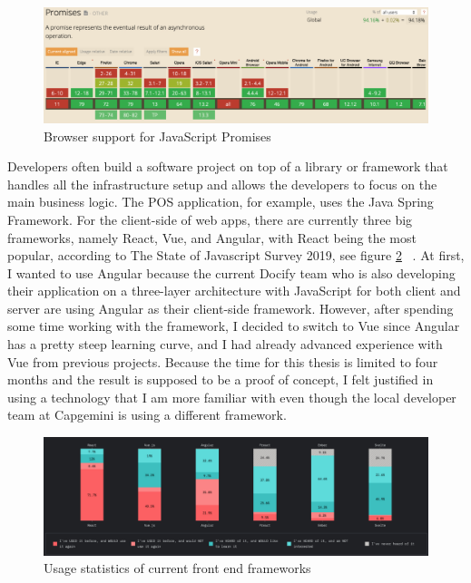 \begin{figure}[ht]
  \centering
  \includegraphics[width=0.8\linewidth]{assets/caniuse-promises.png}
  \caption{Browser support for JavaScript Promises}
  \label{fig:caniuse-promises}
\end{figure}

Developers often build a software project on top of a library or framework that handles all the infrastructure setup and allows the developers to focus on the main business logic. The POS application, for example, uses the Java Spring Framework. For the client-side of web apps, there are currently three big frameworks, namely React, Vue, and Angular, with React being the most popular, according to The State of Javascript Survey 2019, see figure \ref{fig:frontend-framework-usage} ~\cite{stateofjs.2019}. At first, I wanted to use Angular because the current Docify team who is also developing their application on a three-layer architecture with JavaScript for both client and server are using Angular as their client-side framework. However, after spending some time working with the framework, I decided to switch to Vue since Angular has a pretty steep learning curve, and I had already advanced experience with Vue from previous projects. Because the time for this thesis is limited to four months and the result is supposed to be a proof of concept, I felt justified in using a technology that I am more familiar with even though the local developer team at Capgemini is using a different framework.

\begin{figure}[ht]
  \centering
  \includegraphics[width=0.8\linewidth]{assets/frontend-framework-usage.png}
  \caption{Usage statistics of current front end frameworks}
  \label{fig:frontend-framework-usage}
\end{figure}

